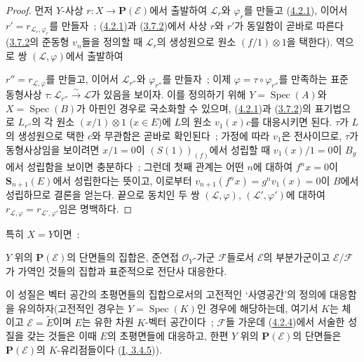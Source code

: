 \begin{proof}
먼저 $Y$-사상 $r:X\to\mathbf{P}(\mathcal{E})$에서 출발하여
$\mathcal{L}_r$와 $\varphi_r$를 만들고
(\hyperref[II.4.2.1-ko]{4.2.1}), 이어서
$r'=r_{\mathcal{L}_r,\varphi_r}$를 만들자~;
(\hyperref[II.4.2.1-ko]{4.2.1})과
(\hyperref[II.3.7.2-ko]{3.7.2})에서 사상 $r$와 $r'$가 동일함이 곧바로
따른다(\hyperref[II.3.7.2-ko]{3.7.2}의 준동형 $v_n$들을 정의할 때
$\mathcal{L}_r$의 생성원으로 원소 $(f/1)\otimes1$을 택한다).
역으로 쌍 $(\mathcal{L},\varphi)$에서 출발하여


$r''=r_{\mathcal{L},\varphi}$를 만들고, 이어서 $\mathcal{L}_{r''}$와
$\varphi_{r''}$를 만들자~; 이제
$\varphi=\tau\circ\varphi_{r''}$를 만족하는 표준 동형사상
$\tau:\mathcal{L}_{r''}\xrightarrow{\sim}\mathcal{L}$가 있음을 보이자.
이를 정의하기 위해 $Y=\operatorname{Spec}(A)$와
$X=\operatorname{Spec}(B)$가 아핀인 경우로 국소화할 수 있으며,
(\hyperref[II.4.2.1-ko]{4.2.1})과
(\hyperref[II.3.7.2-ko]{3.7.2})의 표기법으로
$L_{r''}$의 각 원소 $(x/1)\otimes1$ ($x\in E$)에 $L$의 원소
$v_1(x)c$를 대응시키면 된다. $\tau$가 $L$의 생성원으로 택한 $c$와
무관함은 곧바로 확인된다~; 가정에 따라 $v_1$은 전사이므로,
$\tau$가 동형사상임을 보이려면 $x/1=0$이 $(S(1))_{(f)}$에서 성립할 때
$v_1(x)/1=0$이 $B_g$에서 성립함을 보이면 충분하다~; 그런데 첫째
관계는 어떤 $n$에 대하여 $f^nx=0$이 $\mathbf{S}_{n+1}(E)$에서
성립한다는 뜻이고, 이로부터
$v_{n+1}(f^nx)=g^nv_1(x)=0$이 $B$에서 성립하므로 결론을 얻는다.
끝으로 동치인 두 쌍 $(\mathcal{L},\varphi)$,
$(\mathcal{L}',\varphi')$에 대하여
$r_{\mathcal{L},\varphi}=r_{\mathcal{L}',\varphi'}$임은 명백하다.
\end{proof}

특히 $X=Y$이면~:

\begin{theorem}[4.2.4]
\label{II.4.2.4-ko}
$Y$ 위의 $\mathbf{P}(\mathcal{E})$의 단면들의 집합은, 준연접
$\mathcal{O}_Y$-가군 $\mathcal{F}$들로서 $\mathcal{E}$의 부분가군이고
$\mathcal{E}/\mathcal{F}$가 가역인 것들의 집합과 표준적으로 전단사
대응한다.
\end{theorem}

이 성질은 벡터 공간의 초평면들의 집합으로서의 고전적인
‘사영공간’의 정의에 대응함을 유의하자(고전적인 경우는
$Y=\operatorname{Spec}(K)$인 경우에 해당하는데, 여기서 $K$는 체이고
$\mathcal{E}=\widetilde{E}$이며 $E$는 유한 차원 $K$-벡터 공간이다~;
$\mathcal{F}$들 가운데 (\hyperref[II.4.2.4-ko]{4.2.4})에서 서술한
성질을 갖는 것들은 이때 $E$의 초평면들에 대응하고, 한편 $Y$ 위의
$\mathbf{P}(\mathcal{E})$의 단면들은 $\mathbf{P}(\mathcal{E})$의
$K$-유리점들이다
(\hyperref[I.3.4.5-ko]{I, 3.4.5})).

